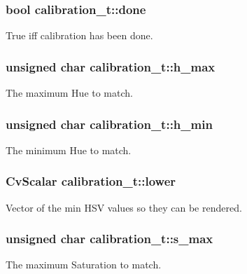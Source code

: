 \subsubsection[{\texorpdfstring{done}{done}}]{\setlength{\rightskip}{0pt plus 5cm}bool calibration\+\_\+t\+::done}\hypertarget{structcalibration__t_af77af4f1701757e606eaf3e368b4e3ac}{}\label{structcalibration__t_af77af4f1701757e606eaf3e368b4e3ac}
True iff calibration has been done. 
\subsubsection[{\texorpdfstring{h\+\_\+max}{h_max}}]{\setlength{\rightskip}{0pt plus 5cm}unsigned char calibration\+\_\+t\+::h\+\_\+max}\hypertarget{structcalibration__t_acd97fa79e525e64737d8702d397cb5f3}{}\label{structcalibration__t_acd97fa79e525e64737d8702d397cb5f3}
The maximum Hue to match. 
\subsubsection[{\texorpdfstring{h\+\_\+min}{h_min}}]{\setlength{\rightskip}{0pt plus 5cm}unsigned char calibration\+\_\+t\+::h\+\_\+min}\hypertarget{structcalibration__t_a3e7b54f5a944fac9d22227d36df4f4b7}{}\label{structcalibration__t_a3e7b54f5a944fac9d22227d36df4f4b7}
The minimum Hue to match. 
\subsubsection[{\texorpdfstring{lower}{lower}}]{\setlength{\rightskip}{0pt plus 5cm}Cv\+Scalar calibration\+\_\+t\+::lower}\hypertarget{structcalibration__t_af589528a1493701150229b3d41e13bfa}{}\label{structcalibration__t_af589528a1493701150229b3d41e13bfa}
Vector of the min H\+SV values so they can be rendered. 
\subsubsection[{\texorpdfstring{s\+\_\+max}{s_max}}]{\setlength{\rightskip}{0pt plus 5cm}unsigned char calibration\+\_\+t\+::s\+\_\+max}\hypertarget{structcalibration__t_af47b23a52b19fe1b9c097f16cf39c38e}{}\label{structcalibration__t_af47b23a52b19fe1b9c097f16cf39c38e}
The maximum Saturation to match. 

